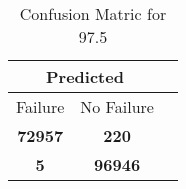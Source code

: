 \begin{table}[] 
\caption{Confusion Matric for 97.5} 
\label{Table: Prediction Accuracy-DMD97.5OnlySunEKF-ignoreReflectionEKF-top2perfectNoFailurePrediction-Reflection} 
\centering 
\begin{tabular} 
 {@{}ccc@{}} 
\toprule 
\multicolumn{2}{c}{\textbf{Predicted}}
 \\ \midrule 
\multicolumn{1}{|c|}{Failure} & 
\multicolumn{1}{c|}{No Failure}
 \\ \midrule 
\multicolumn{1}{|c|}{\color{green}\textbf{72957}} & 
\multicolumn{1}{c|}{\color{red}\textbf{220}}
 \\ \midrule 
\multicolumn{1}{|c|}{\color{red}\textbf{5}} & 
\multicolumn{1}{c|}{\color{green}\textbf{96946}}
 \\ \bottomrule 
\end{tabular} 
\end{table} 
